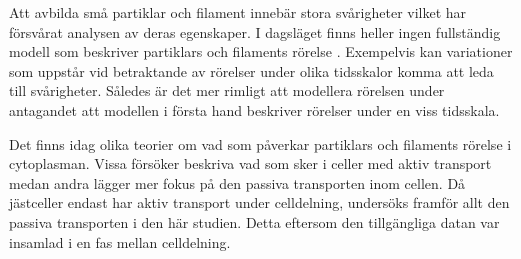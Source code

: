 Att avbilda små partiklar och filament innebär stora svårigheter vilket har försvårat analysen av deras egenskaper. I dagsläget finns heller ingen fullständig modell som beskriver partiklars och filaments rörelse \cite{}. %
Exempelvis kan variationer som uppstår vid betraktande av rörelser under olika tidsskalor komma att leda till svårigheter. %
Således är det mer rimligt att modellera rörelsen under antagandet att modellen i första hand beskriver rörelser under en viss tidsskala.%

Det finns idag olika teorier om vad som påverkar partiklars och filaments rörelse i cytoplasman. Vissa försöker beskriva vad som sker i celler med aktiv transport medan andra lägger mer fokus på den passiva transporten inom cellen. Då jästceller endast har aktiv transport under celldelning, undersöks framför allt den passiva transporten i den här studien. Detta eftersom den tillgängliga datan var insamlad i en fas mellan celldelning. 












